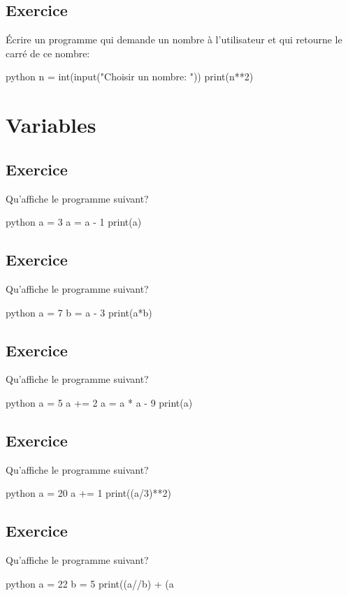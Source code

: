 \documentclass[a4paper,11pt]{article}
\begin{document}
\subsection{Exercice}
Écrire un programme qui demande un nombre à l'utilisateur et qui retourne le carré de ce nombre:\\
\begin{solution}
\begin{code}[interactive]{python}
n = int(input("Choisir un nombre: "))
print(n**2)
\end{code}
\end{solution}

\section{Variables}

\subsection{Exercice}
Qu'affiche le programme suivant?
\begin{code}[interactive]{python}
a = 3
a = a - 1
print(a)
\end{code}

\subsection{Exercice}
Qu'affiche le programme suivant?
\begin{code}[interactive]{python}
a = 7
b = a - 3
print(a*b)
\end{code}

\subsection{Exercice}
Qu'affiche le programme suivant?
\begin{code}[interactive]{python}
a = 5
a += 2
a = a * a - 9
print(a)
\end{code}

\subsection{Exercice}
Qu'affiche le programme suivant?
\begin{code}[interactive]{python}
a = 20
a += 1
print((a/3)**2)
\end{code}

\subsection{Exercice}
Qu'affiche le programme suivant?
\begin{code}[interactive]{python}
a = 22
b = 5
print((a//b) + (a%
\end{code}
\end{document}
